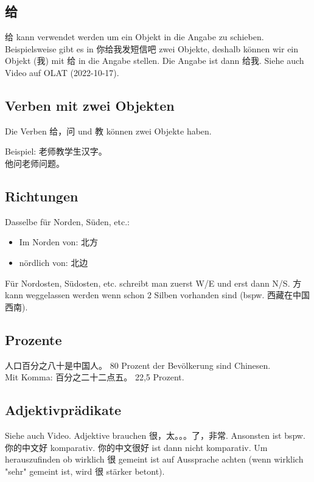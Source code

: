 \documentclass[UTF8]{ctexart}
\begin{document}
\subsection{给}

给 kann verwendet werden um ein Objekt in die Angabe zu schieben. Beispielsweise gibt es in 你给我发短信吧 zwei Objekte, deshalb können wir ein Objekt (我) mit 给 in die Angabe stellen. Die Angabe ist dann 给我. Siehe auch Video auf OLAT (2022-10-17).

\subsection{Verben mit zwei Objekten}

Die Verben 给，问 und 教 können zwei Objekte haben.

Beispiel: 老师教学生汉字。\\
他问老师问题。

\subsection{Richtungen}

Dasselbe für Norden, Süden, etc.:

\begin{itemize}
    \item Im Norden von: 北方
    \item nördlich von: 北边
\end{itemize}

Für Nordosten, Südosten, etc. schreibt man zuerst W/E und erst dann N/S. 方 kann weggelassen werden wenn schon 2 Silben vorhanden sind (bspw. 西藏在中国西南).

\subsection{Prozente}

人口百分之八十是中国人。 80 Prozent der Bevölkerung sind Chinesen.\\
Mit Komma: 百分之二十二点五。 22,5 Prozent.

\subsection{Adjektivprädikate}

Siehe auch Video. Adjektive brauchen 很，太。。。了，非常. Ansonsten ist bspw. 你的中文好 komparativ. 你的中文很好 ist dann nicht komparativ. Um herauszufinden ob wirklich 很 gemeint ist auf Aussprache achten (wenn wirklich "sehr" gemeint ist, wird 很 stärker betont).
\end{document}
